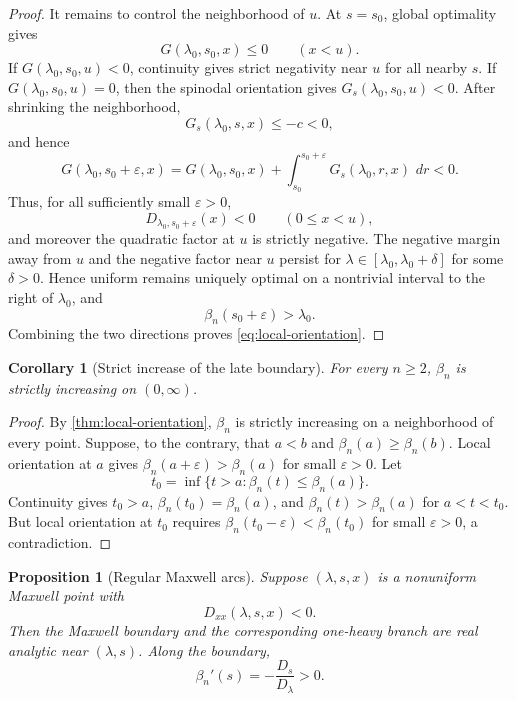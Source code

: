 \documentclass[11pt]{article}
\theoremstyle{plain}
\newtheorem{proposition}[theorem]{Proposition}
\newtheorem{corollary}[theorem]{Corollary}
\theoremstyle{definition}
\theoremstyle{remark}
\newcommand{\dd}{\,d}
\begin{document}
\begin{proof}
It remains to control the neighborhood of \(u\).  At \(s=s_0\), global optimality gives
\[
G(\lambda_0,s_0,x)\le0
\qquad(x<u).
\]
If \(G(\lambda_0,s_0,u)<0\), continuity gives strict negativity near \(u\) for all nearby \(s\).  If \(G(\lambda_0,s_0,u)=0\), then the spinodal orientation gives \(G_s(\lambda_0,s_0,u)<0\).  After shrinking the neighborhood,
\[
G_s(\lambda_0,s,x)\le-c<0,
\]
and hence
\[
G(\lambda_0,s_0+\varepsilon,x)
=G(\lambda_0,s_0,x)
+\int_{s_0}^{s_0+\varepsilon}G_s(\lambda_0,r,x)\,\dd r
<0.
\]
Thus, for all sufficiently small \(\varepsilon>0\),
\[
D_{\lambda_0,s_0+\varepsilon}(x)<0
\qquad(0\le x<u),
\]
and moreover the quadratic factor at \(u\) is strictly negative.  The negative margin away from \(u\) and the negative factor near \(u\) persist for \(\lambda\in[\lambda_0,\lambda_0+\delta]\) for some \(\delta>0\).  Hence uniform remains uniquely optimal on a nontrivial interval to the right of \(\lambda_0\), and
\[
\beta_n(s_0+\varepsilon)>\lambda_0.
\]
Combining the two directions proves \eqref{eq:local-orientation}.
\end{proof}

\begin{corollary}[Strict increase of the late boundary]\label{cor:beta-strict-new}
For every \(n\ge2\), \(\beta_n\) is strictly increasing on \((0,\infty)\).
\end{corollary}

\begin{proof}
By \cref{thm:local-orientation}, \(\beta_n\) is strictly increasing on a neighborhood of every point.  Suppose, to the contrary, that \(a<b\) and \(\beta_n(a)\ge\beta_n(b)\).  Local orientation at \(a\) gives \(\beta_n(a+\varepsilon)>\beta_n(a)\) for small \(\varepsilon>0\).  Let
\[
t_0=\inf\{t>a:\beta_n(t)\le\beta_n(a)\}.
\]
Continuity gives \(t_0>a\), \(\beta_n(t_0)=\beta_n(a)\), and \(\beta_n(t)>\beta_n(a)\) for \(a<t<t_0\).  But local orientation at \(t_0\) requires \(\beta_n(t_0-\varepsilon)<\beta_n(t_0)\) for small \(\varepsilon>0\), a contradiction.
\end{proof}

\begin{proposition}[Regular Maxwell arcs]\label{prop:regular-maxwell-arcs}
Suppose \((\lambda,s,x)\) is a nonuniform Maxwell point with
\[
D_{xx}(\lambda,s,x)<0.
\]
Then the Maxwell boundary and the corresponding one-heavy branch are real analytic near \((\lambda,s)\).  Along the boundary,
\begin{equation}\label{eq:beta-slope-new}
\beta_n'(s)=-\frac{D_s}{D_\lambda}>0.
\end{equation}
\end{proposition}
\end{document}
